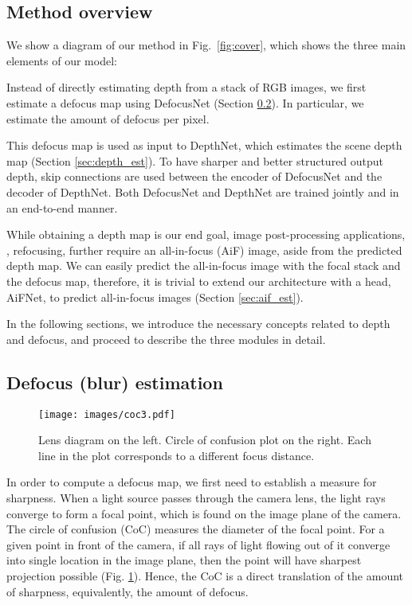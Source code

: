 \documentclass[10pt,twocolumn,letterpaper]{article}
\begin{document}
\subsection{Method overview} 
\label{sec:overview}

We show a diagram of our method in Fig.~\ref{fig:cover}, which shows the three main elements of our model:



 Instead of directly estimating depth from a stack of RGB images, we first estimate a defocus map using DefocusNet (Section \ref{sec:defocus}). In particular, we estimate the amount of defocus per pixel.


 This defocus map is used as input to DepthNet, which estimates the scene depth map (Section \ref{sec:depth_est}).
To have sharper and better structured output depth, skip connections are used between the encoder of DefocusNet and the decoder of DepthNet.
Both DefocusNet and DepthNet are trained jointly and in an end-to-end manner.


 While obtaining a depth map is our end goal, image post-processing applications, \eg, refocusing, further require an all-in-focus (AiF) image, aside from the predicted depth map. 
We can easily predict the all-in-focus image with the focal stack and the defocus map, therefore, it is trivial to extend our architecture with a head, AiFNet, to predict all-in-focus images (Section \ref{sec:aif_est}).




In the following sections, we introduce the necessary concepts related to depth and defocus, and proceed to describe the three modules in detail.

\subsection{Defocus (blur) estimation} \label{sec:defocus}

\begin{figure}[t]
\begin{center}
 \texttt{[image: images/coc3.pdf]}
\end{center}
   \caption{Lens diagram on the left. Circle of confusion plot on the right. Each line in the plot corresponds to a different focus distance. }
\label{fig:CoC}
\end{figure}

In order to compute a defocus map, we first need to establish a measure for sharpness. When a light source passes through the camera lens, the light rays converge to form a focal point, which is found on the image plane of the camera. The circle of confusion (CoC) measures the diameter of the focal point. 
For a given point in front of the camera, if all rays of light flowing out of it converge into single location in the image plane, then the point will have sharpest projection possible (Fig. \ref{fig:CoC}).
Hence, the CoC is a direct translation of the amount of sharpness, equivalently, the amount of defocus.
\end{document}
